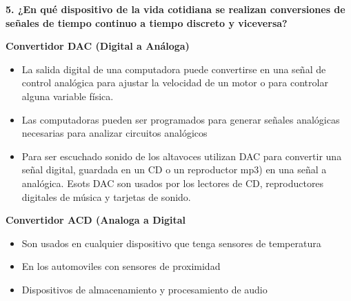 \documentclass{article}
\begin{document}
	
	\noindent\textbf{5. ¿En  qué  dispositivo  de  la  vida  cotidiana  se  realizan  conversiones  de  señales  de  tiempo  continuo  a  tiempo discreto y viceversa?}
	\newline
	
	\textbf{Convertidor DAC (Digital a Análoga)}
	\begin{itemize}
		\item La salida digital de una computadora puede convertirse en una señal de control analógica para ajustar la velocidad de un motor o para controlar alguna variable física.
		\item Las computadoras pueden ser programados para generar señales analógicas necesarias para analizar circuitos analógicos
		\item Para ser escuchado sonido de los altavoces utilizan DAC para convertir una señal digital, guardada en un CD o un reproductor mp3) en una señal a analógica. Esots DAC son usados por los lectores de CD, reproductores digitales de música y tarjetas de sonido.
	\end{itemize}
	
	\textbf{Convertidor ACD (Analoga a Digital}
	\begin{itemize}
		\item Son usados en cualquier dispositivo que tenga sensores de temperatura
		\item En los automoviles con sensores de proximidad
		\item Dispositivos de almacenamiento y procesamiento de audio
	\end{itemize}
	
\end{document}
